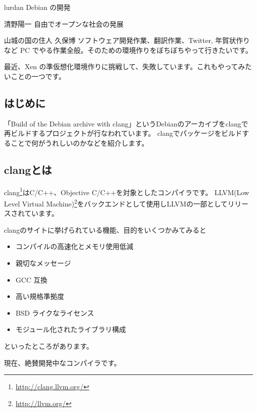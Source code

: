 \documentclass[mingoth,a4paper]{jsarticle}
\begin{document}
\begin{prework}{ lurdan }
Debian の開発
\end{prework}

\begin{prework}{ 清野陽一 }
自由でオープンな社会の発展
\end{prework}

\begin{prework}{ 山城の国の住人 久保博 }
ソフトウェア開発作業、翻訳作業、Twitter, 年賀状作りなど PC でやる作業全般。そのための環境作りをぼちぼちやって行きたいです。

最近、Xen の準仮想化環境作りに挑戦して、失敗しています。これもやってみたいことの一つです。
\end{prework}

\clearpage


\subsection{はじめに}
「Build of the Debian archive with clang」\cite{clangdebiannet}というDebianのアーカイブをclangで再ビルドするプロジェクトが行なわれています。
clangでパッケージをビルドすることで何がうれしいのかなどを紹介します。

\subsection{clangとは}
clang\footnote{\url{http://clang.llvm.org/}}はC/C++、Objective C/C++を対象としたコンパイラです。
LLVM(Low Level Virtual Machine)\footnote{\url{http://llvm.org/}}をバックエンドとして使用しLLVMの一部としてリリースされています。

clangのサイトに挙げられている機能、目的をいくつかみてみると

\begin{itemize}
\item コンパイルの高速化とメモリ使用低減
\item 親切なメッセージ
\item GCC 互換
\item 高い規格準拠度
\item BSD ライクなライセンス
\item モジュール化されたライブラリ構成
\end{itemize}

といったところがあります。

現在、絶賛開発中なコンパイラです。
\end{document}
